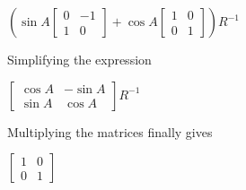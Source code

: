 \documentclass{article}
\begin{document}
\begin{center}
$\left (\sin A\left [\begin{array}{cc}0 &  -1 \\
1 & 0^{}\end{array}\right ] +\cos A\left [\begin{array}{cc}1 & 0 \\
0 & 1\end{array}\right ]\right )R^{ -1}$\newline
\end{center}\par

Simplifying the expression

\begin{center}
$\left [\begin{array}{cc}\cos A &  -\sin A \\
\sin A & \cos A\end{array}\right ]R^{ -1}$\linebreak\relax
\end{center}\par

Multiplying the matrices finally gives

\begin{center}
$\left [\begin{array}{cc}1 & 0 \\
0 & 1\end{array}\right ]$
\end{center}\par
\end{document}
